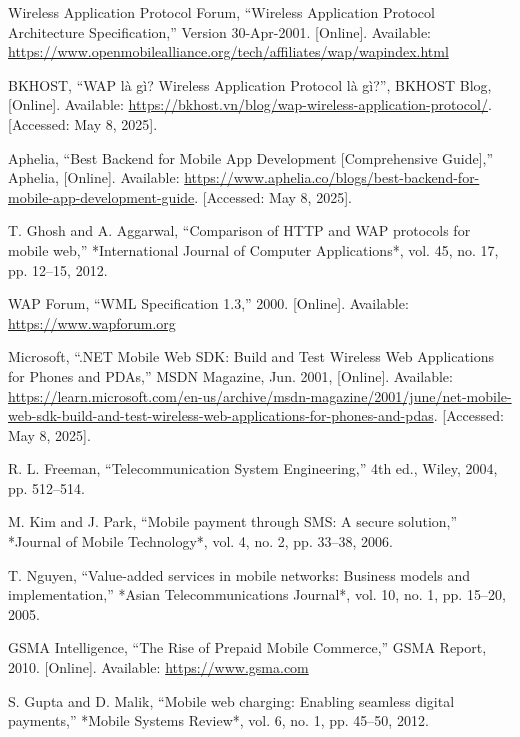 \documentclass[12pt]{report}
\begin{document}
\begin{thebibliography}{1}
  Wireless Application Protocol Forum, ``Wireless Application Protocol Architecture Specification,'' Version 30-Apr-2001. [Online]. Available: \url{https://www.openmobilealliance.org/tech/affiliates/wap/wapindex.html}

  BKHOST, “WAP là gì? Wireless Application Protocol là gì?”, BKHOST Blog, [Online]. Available: \url{https://bkhost.vn/blog/wap-wireless-application-protocol/}. [Accessed: May 8, 2025].


  Aphelia, “Best Backend for Mobile App Development [Comprehensive Guide],” Aphelia, [Online]. Available: \url{https://www.aphelia.co/blogs/best-backend-for-mobile-app-development-guide}. [Accessed: May 8, 2025].


  T. Ghosh and A. Aggarwal, ``Comparison of HTTP and WAP protocols for mobile web,'' *International Journal of Computer Applications*, vol. 45, no. 17, pp. 12–15, 2012.

  WAP Forum, ``WML Specification 1.3,'' 2000. [Online]. Available: \url{https://www.wapforum.org}

  Microsoft, “.NET Mobile Web SDK: Build and Test Wireless Web Applications for Phones and PDAs,” MSDN Magazine, Jun. 2001, [Online]. Available: \url{https://learn.microsoft.com/en-us/archive/msdn-magazine/2001/june/net-mobile-web-sdk-build-and-test-wireless-web-applications-for-phones-and-pdas}. [Accessed: May 8, 2025].


  R. L. Freeman, ``Telecommunication System Engineering,'' 4th ed., Wiley, 2004, pp. 512–514.

  M. Kim and J. Park, ``Mobile payment through SMS: A secure solution,'' *Journal of Mobile Technology*, vol. 4, no. 2, pp. 33–38, 2006.

  T. Nguyen, ``Value-added services in mobile networks: Business models and implementation,'' *Asian Telecommunications Journal*, vol. 10, no. 1, pp. 15–20, 2005.

  GSMA Intelligence, ``The Rise of Prepaid Mobile Commerce,'' GSMA Report, 2010. [Online]. Available: \url{https://www.gsma.com}

  S. Gupta and D. Malik, ``Mobile web charging: Enabling seamless digital payments,'' *Mobile Systems Review*, vol. 6, no. 1, pp. 45–50, 2012.


\end{thebibliography}
\end{document}
